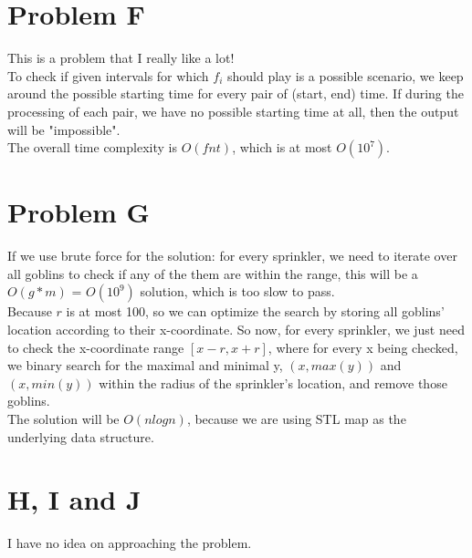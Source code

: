 \documentclass[10pt]{article}
\begin{document}


\newpage



\section*{Problem F}

This is a problem that I really like a lot!\\

To check if given intervals for which $f_i$ should play is a possible scenario,  we keep around the possible starting time for every pair of (start, end) time. If during the processing of each pair, we have no possible starting time at all, then the output will be "impossible". \\

The overall time complexity is $O(fnt)$, which is at most $O(10^{7})$.\\



\newpage



\section*{Problem G}

If we use brute force for the solution: for every sprinkler, we need to iterate over all goblins to check if any of the them are within the range, this will be a $O(g * m)$ = $O(10^9)$ solution, which is too slow to pass. \\

Because $r$ is at most 100, so we can optimize the search by storing all goblins' location according to their x-coordinate. So now, for every sprinkler, we just need to check the x-coordinate range $[x - r, x + r]$, where for every x being checked, we binary search for the maximal and minimal y, $(x, max(y))$ and $(x, min(y))$ within the radius of the sprinkler's location, and remove those goblins.\\

The solution will be $O(nlogn)$, because we are using STL map as the underlying data structure. \\



\newpage

\section*{H, I and J}

I have no idea on approaching the problem.
\end{document}
